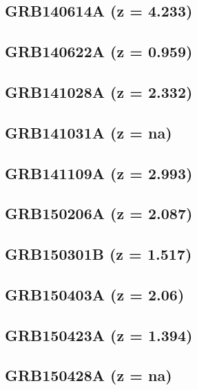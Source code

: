 \documentclass{aa}    %
\begin{document}
\subsection{GRB140614A (z = 4.233)}	



\subsection{GRB140622A (z = 0.959)}	



\subsection{GRB141028A (z = 2.332)}	



\subsection{GRB141031A  (z = na)}	



\subsection{GRB141109A (z = 2.993)}	



\subsection{GRB150206A (z = 2.087)}	



\subsection{GRB150301B (z = 1.517)}	



\subsection{GRB150403A (z = 2.06)}	



\subsection{GRB150423A (z = 1.394)}	



\subsection{GRB150428A (z = na)}	
\end{document}
